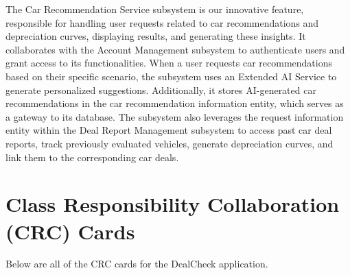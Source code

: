 \documentclass[]{article}
\begin{document}
The Car Recommendation Service subsystem is our innovative feature, responsible for handling user requests related to car recommendations and depreciation curves, displaying results, and generating these insights. It collaborates with the Account Management subsystem to authenticate users and grant access to its functionalities. When a user requests car recommendations based on their specific scenario, the subsystem uses an Extended AI Service to generate personalized suggestions. Additionally, it stores AI-generated car recommendations in the car recommendation information entity, which serves as a gateway to its database. The subsystem also leverages the request information entity within the Deal Report Management subsystem to access past car deal reports, track previously evaluated vehicles, generate depreciation curves, and link them to the corresponding car deals.



\pagebreak

\section{Class Responsibility Collaboration (CRC) Cards}
\label{sec:class_responsibility_collaboration_crc_cards}
Below are all of the CRC cards for the DealCheck application.
\end{document}
